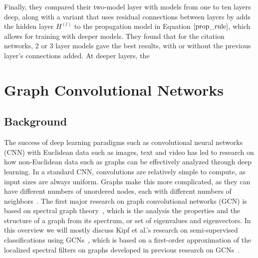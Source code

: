 Finally, they compared their two-model layer with models from one to ten layers deep, along with a variant that uses residual connections between layers by adds the hidden layer $H^{(l)}$ to the propagation model in Equation $\ref{prop_rule}$, which allows for training with deeper models. They found that for the citation networks, 2 or 3 layer models gave the best results, with or without the previous layer's connections added. At deeper layers, the  
\section{Graph Convolutional Networks}
\subsection{Background}
The success of deep learning paradigms such as convolutional neural networks (CNN) with Euclidean data such as images, text and video has led to research on how non-Euclidean data such as graphs can be effectively analyzed through deep learning. In a standard CNN, convolutions are relatively simple to compute, as input sizes are always uniform. Graphs make this more complicated, as they can have different numbers of unordered nodes, each with different numbers of neighbors~\cite{Wu2019}. The first major research on graph convolutional networks (GCN) is based on spectral graph theory~\cite{Bruna2013}, which is the analysis the properties and the structure of a graph from its spectrum, or set of eigenvalues and eigenvectors. In this overview we will mostly discuss Kipf et al.'s research on semi-supervised classifications using GCNs~\cite{Kipf2016}, which is based on a first-order approximation of the localized spectral filters on graphs developed in previous research on GCNs~\cite{Bruna2013}. 

